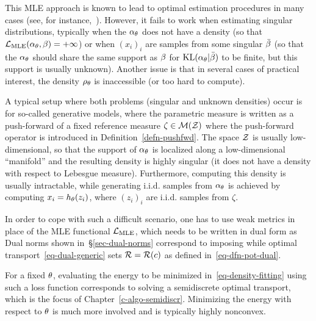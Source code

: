 \newcommand{\fPF}{h}

This MLE approach is known to lead to optimal estimation procedures in many cases (see, for instance,~\citet{owen2001empirical}). However, it fails to work when estimating singular distributions, typically when the $\alpha_\theta$ does not have a density (so that $\mathcal{L}_{\text{MLE}}(\alpha_\theta,\beta) = +\infty$) or when $(x_i)_i$ are samples from some singular $\bar{\beta}$ (so that the $\alpha_\theta$ should share the same support as $\beta$ for $\operatorname{KL}(\alpha_\theta|\bar{\beta})$ to be finite, but this support is usually unknown). Another issue is that in several cases of practical interest, the density $\rho_{\theta}$ is inaccessible (or too hard to compute).

A typical setup where both problems (singular and unknown densities) occur is for so-called generative models, where the parametric measure is written as a push-forward of a fixed reference measure $\zeta \in \mathcal{M}(\mathcal{Z})$
\eq{
	\al_\th = \fPF_{\th,\sharp} \zeta \qwhereq \fPF_\th : \Zz \rightarrow \Xx,
}
where the push-forward operator is introduced in Definition~\ref{defn-pushfwd}. The space $\mathcal{Z}$ is usually low-dimensional, so that the support of $\alpha_\theta$ is localized along a low-dimensional ``manifold'' and the resulting density is highly singular (it does not have a density with respect to Lebesgue measure).
%
Furthermore, computing this density is usually intractable, while generating i.i.d. samples from $\alpha_\theta$ is achieved by computing $x_i=\fPF_\th(z_i)$, where $(z_i)_i$ are i.i.d. samples from $\zeta$.

In order to cope with such a difficult scenario, one has to use weak metrics in place of the MLE functional $\mathcal{L}_{\text{MLE}}$, which needs to be written in dual form as 
Dual norms shown in~\S\ref{sec-dual-norms} correspond to imposing 
while optimal transport~\eqref{eq-dual-generic} sets $\mathcal{R} = \mathcal{R}(c)$ as defined in~\eqref{eq-dfn-pot-dual}. 

For a fixed $\theta$, evaluating the energy to be minimized in~\eqref{eq-density-fitting} using such a loss function corresponds to solving a semidiscrete optimal transport, which is the focus of Chapter~\ref{c-algo-semidiscr}. Minimizing the energy with respect to $\theta$ is much more involved and is typically highly nonconvex.

